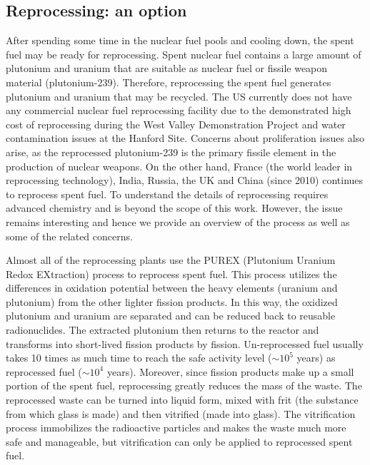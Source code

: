 \documentclass[nofootinbib,preprint,aps]{revtex4-1}
\begin{document}
    \subsection{Reprocessing: an option}
    \label{sec:reproc}
    After spending some time in the nuclear fuel pools and cooling down, the spent fuel may be ready
    for reprocessing.
    Spent nuclear fuel contains a large amount of plutonium and uranium that are suitable as nuclear fuel
    or fissile weapon material (plutonium-239). Therefore, reprocessing the spent fuel generates plutonium and
    uranium that may be recycled. The US currently does not have any commercial nuclear fuel
    reprocessing facility due to the demonstrated high cost of reprocessing
    during the West Valley Demonstration Project and water contamination issues at the Hanford Site.
    Concerns about proliferation issues also arise, as the 
    reprocessed plutonium-239 is the primary fissile element in the production of nuclear weapons.\cite{aa12}
    On the other hand, France (the world leader in reprocessing technology), India, Russia, the UK
    and China (since 2010) continues to reprocess spent fuel. To understand the details of reprocessing
    requires advanced chemistry and is beyond the scope of this work. However, the issue remains interesting
    and hence we provide an overview of the process as well as some of the related concerns.

    Almost all of the reprocessing plants use the PUREX (Plutonium Uranium Redox EXtraction) process
    to reprocess spent fuel. This process utilizes the differences in oxidation potential 
    between the heavy elements (uranium and plutonium) from the other lighter fission products.
    In this way,
    the oxidized plutonium and uranium are separated and can be reduced back to reusable radionuclides.\cite{lb01} 
    The extracted plutonium then returns to the reactor and transforms into short-lived fission products
    by fission. Un-reprocessed fuel usually takes 10 times as much time to reach the safe
    activity level ($\sim 10^5$ years) as reprocessed fuel ($\sim 10^4$ years). Moreover, since fission products
    make up a small portion of the spent fuel, reprocessing greatly reduces the mass of the waste. The reprocessed
    waste can be turned into liquid form, mixed with frit (the substance from which glass is made) and then
    vitrified (made into glass). The vitrification process immobilizes the radioactive particles and makes
    the waste much more safe and manageable, but vitrification can only be applied to reprocessed spent fuel.
\end{document}
